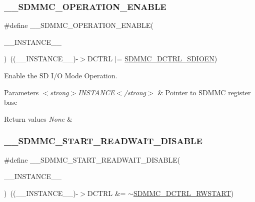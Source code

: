 \subsubsection{\texorpdfstring{\_\_SDMMC\_OPERATION\_ENABLE}{\_\_SDMMC\_OPERATION\_ENABLE}}
{\footnotesize\ttfamily \#define \+\_\+\+\_\+\+S\+D\+M\+M\+C\+\_\+\+O\+P\+E\+R\+A\+T\+I\+O\+N\+\_\+\+E\+N\+A\+B\+LE(\begin{DoxyParamCaption}\item[{}]{\+\_\+\+\_\+\+I\+N\+S\+T\+A\+N\+C\+E\+\_\+\+\_\+ }\end{DoxyParamCaption})~((\+\_\+\+\_\+\+I\+N\+S\+T\+A\+N\+C\+E\+\_\+\+\_\+)-\/$>$D\+C\+T\+RL $\vert$= \mbox{\hyperlink{group___peripheral___registers___bits___definition_gab66312264da16d4693a3c9a9cba33c9e}{S\+D\+M\+M\+C\+\_\+\+D\+C\+T\+R\+L\+\_\+\+S\+D\+I\+O\+EN}})}



Enable the SD I/O Mode Operation. 


\begin{DoxyParams}{Parameters}
{\em $<$strong$>$\+I\+N\+S\+T\+A\+N\+C\+E$<$/strong$>$} & Pointer to S\+D\+M\+MC register base\\
\hline
\end{DoxyParams}

\begin{DoxyRetVals}{Return values}
{\em None} & \\
\hline
\end{DoxyRetVals}
\mbox{\label{group___s_d_m_m_c___l_l___interrupt___clock_gadd96ec39161ec584cfbeb743c2e0955f}} 
\subsubsection{\texorpdfstring{\_\_SDMMC\_START\_READWAIT\_DISABLE}{\_\_SDMMC\_START\_READWAIT\_DISABLE}}
{\footnotesize\ttfamily \#define \+\_\+\+\_\+\+S\+D\+M\+M\+C\+\_\+\+S\+T\+A\+R\+T\+\_\+\+R\+E\+A\+D\+W\+A\+I\+T\+\_\+\+D\+I\+S\+A\+B\+LE(\begin{DoxyParamCaption}\item[{}]{\+\_\+\+\_\+\+I\+N\+S\+T\+A\+N\+C\+E\+\_\+\+\_\+ }\end{DoxyParamCaption})~((\+\_\+\+\_\+\+I\+N\+S\+T\+A\+N\+C\+E\+\_\+\+\_\+)-\/$>$D\+C\+T\+RL \&= $\sim$\mbox{\hyperlink{group___peripheral___registers___bits___definition_ga4302f186ec1e43bc38a4357db38fc0fa}{S\+D\+M\+M\+C\+\_\+\+D\+C\+T\+R\+L\+\_\+\+R\+W\+S\+T\+A\+RT}})}



